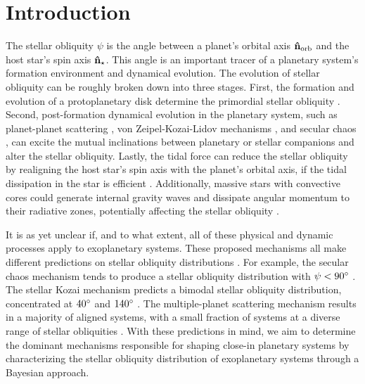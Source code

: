 \documentclass[twocolumn,times]{aastex631}
\begin{document}
\section{Introduction}
\label{sec:intro}

The stellar obliquity $\psi$ is the angle between a planet's orbital axis $\vb{\hat{n}_{\rm orb}}$ and the host star's spin axis $\vb{\hat{n}_\star}$. 
This angle is an important tracer of a planetary system's formation environment and dynamical evolution. The evolution of stellar obliquity can be roughly broken down into three stages. First, the formation and evolution of a protoplanetary disk determine the primordial stellar obliquity \citep[e.g.,][]{Bate10, Lai11, Batygin12}. Second, post-formation dynamical evolution in the planetary system, such as planet-planet scattering \citep[e.g.,][]{Rasio96, Chatterjee08, Nagasawa08, Beague12}, von Zeipel-Kozai-Lidov mechanisms \citep[e.g.,][]{Wu03, Naoz16}, and secular chaos \citep{Wu11}, can excite the mutual inclinations between planetary or stellar companions and alter the stellar obliquity. Lastly, the tidal force can reduce the stellar obliquity by realigning the host star's spin axis with the planet's orbital axis, if the tidal dissipation in the star is efficient \citep[e.g.,][]{Winn10, Albrecht12}. Additionally, massive stars with convective cores could generate internal gravity waves and dissipate angular momentum to their radiative zones, potentially affecting the stellar obliquity \citep{Rogers12, Rogers13}.

It is as yet unclear if, and to what extent, all of these physical and dynamic processes apply to exoplanetary systems. These proposed mechanisms all make different predictions on stellar obliquity distributions \citep[see][and references therein]{Albrecht22}. For example, the secular chaos mechanism tends to produce a stellar obliquity distribution with $\psi < 90\mbox{$^\circ$}$ \citep[e.g.,][]{Teyssandier19}. The stellar Kozai mechanism predicts a bimodal stellar obliquity distribution, concentrated at $40\mbox{$^\circ$}$ and $140\mbox{$^\circ$}$ \citep[e.g.,][]{Fabrycky07, Anderson16, Vick19}. The multiple-planet scattering mechanism results in a majority of aligned systems, with a small fraction of systems at a diverse range of stellar obliquities \citep[e.g.,][]{Beague12}. 
With these predictions in mind, we aim to determine the dominant mechanisms responsible for shaping close-in planetary systems by characterizing the stellar obliquity distribution of exoplanetary systems through a Bayesian approach.
\end{document}
